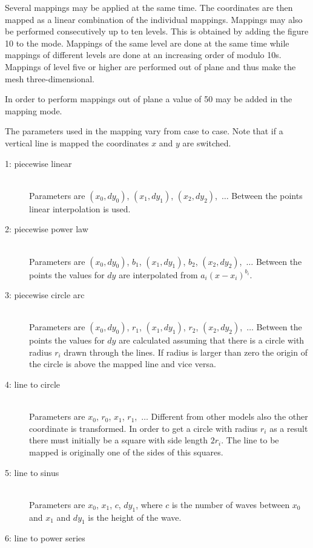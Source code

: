 Several mappings may be applied at the same time. The 
coordinates are then mapped as a linear combination of the 
individual mappings. Mappings may also be performed 
consecutively up to ten levels. This is obtained by adding 
the figure 10 to the mode. Mappings of the same 
level are done at the same time while mappings of different levels
are done at an increasing order of modulo 10s.
Mappings of level five or higher are performed out of plane and
thus make the mesh three-dimensional.

In order to perform mappings out of plane a value
of 50 may be added in the mapping mode.

The parameters used in the mapping vary from case to case.
Note that if a vertical line is mapped the coordinates $x$ and $y$
are switched.
\begin{description}
\item[1: piecewise linear] \mbox{} \\
Parameters are $(x_0,dy_0)$, $(x_1,dy_1)$, $(x_2,dy_2)$,~$\ldots$
Between the points linear interpolation is used. 
\item[2: piecewise power law] \mbox{} \\
Parameters are
$(x_0,dy_0)$, $b_1$, $(x_1,dy_1)$, $b_2$, $(x_2,dy_2)$,~$\ldots$
Between the points the values for $dy$ are interpolated from
$a_i (x-x_i)^{b_i}$.
\item[3: piecewise circle arc] \mbox{} \\
Parameters are
$(x_0,dy_0)$, $r_1$, $(x_1,dy_1)$, $r_2$, $(x_2,dy_2)$,~$\ldots$
Between the points the values for $dy$ are calculated assuming that
there is a circle with radius $r_i$ drawn through the lines.
If radius is larger than zero the origin of the circle is 
above the mapped line and vice versa.
\item[4: line to circle] \mbox{} \\
Parameters are $x_0$, $r_0$, $x_1$, $r_1$,~$\ldots$
Different from other models also the other coordinate is 
transformed. In order to get a circle with radius $r_i$ 
as a result there must initially be a square with 
side length $2r_i$. The line to be mapped is originally 
one of the sides of this squares.
\item[5: line to sinus] \mbox{} \\
Parameters are $x_0$, $x_1$, $c$, $dy_1$,
where $c$ is the number of waves between $x_0$ and $x_1$
and $dy_1$ is the height of the wave.
\item[6: line to power series] \mbox{} \\	

\end{description}
